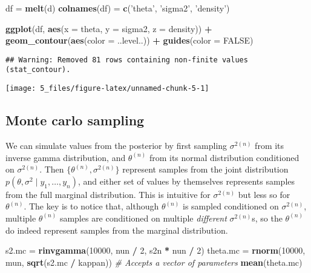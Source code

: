 \documentclass[]{article}
\newenvironment{Shaded}{\begin{snugshade}}{\end{snugshade}}
\newcommand{\CommentTok}[1]{\textcolor[rgb]{0.56,0.35,0.01}{\textit{#1}}}
\newcommand{\DataTypeTok}[1]{\textcolor[rgb]{0.13,0.29,0.53}{#1}}
\newcommand{\DecValTok}[1]{\textcolor[rgb]{0.00,0.00,0.81}{#1}}
\newcommand{\KeywordTok}[1]{\textcolor[rgb]{0.13,0.29,0.53}{\textbf{#1}}}
\newcommand{\NormalTok}[1]{#1}
\newcommand{\OperatorTok}[1]{\textcolor[rgb]{0.81,0.36,0.00}{\textbf{#1}}}
\newcommand{\OtherTok}[1]{\textcolor[rgb]{0.56,0.35,0.01}{#1}}
\newcommand{\StringTok}[1]{\textcolor[rgb]{0.31,0.60,0.02}{#1}}
\begin{document}
\begin{Shaded}
\begin{Highlighting}[]
\NormalTok{df =}\StringTok{ }\KeywordTok{melt}\NormalTok{(d)}
\KeywordTok{colnames}\NormalTok{(df) =}\StringTok{ }\KeywordTok{c}\NormalTok{(}\StringTok{'theta'}\NormalTok{, }\StringTok{'sigma2'}\NormalTok{, }\StringTok{'density'}\NormalTok{)}

\KeywordTok{ggplot}\NormalTok{(df, }\KeywordTok{aes}\NormalTok{(}\DataTypeTok{x =}\NormalTok{ theta, }\DataTypeTok{y =}\NormalTok{ sigma2, }\DataTypeTok{z =}\NormalTok{ density)) }\OperatorTok{+}
\StringTok{  }\KeywordTok{geom_contour}\NormalTok{(}\KeywordTok{aes}\NormalTok{(}\DataTypeTok{color =}\NormalTok{ ..level..)) }\OperatorTok{+}
\StringTok{  }\KeywordTok{guides}\NormalTok{(}\DataTypeTok{color =} \OtherTok{FALSE}\NormalTok{)}
\end{Highlighting}
\end{Shaded}

\begin{verbatim}
## Warning: Removed 81 rows containing non-finite values (stat_contour).
\end{verbatim}

\begin{center}\texttt{[image: 5\_files/figure-latex/unnamed-chunk-5-1]} \end{center}

\hypertarget{monte-carlo-sampling}{%
\subsection{Monte carlo sampling}\label{monte-carlo-sampling}}

We can simulate values from the posterior by first sampling
\(\sigma^{2(n)}\) from its inverse gamma distribution, and
\(\theta^{(n)}\) from its normal distribution conditioned on
\(\sigma^{2(n)}\). Then \(\{\theta^{(n)}, \sigma^{2(n)}\}\) represent
samples from the joint distribution
\(p(\theta, \sigma^2 \mid y_1, \dots, y_n)\), and either set of values
by themselves represents samples from the full marginal distribution.
This is intuitive for \(\sigma^{2(n)}\) but less so for
\(\theta^{(n)}\). The key is to notice that, although \(\theta^{(n)}\)
is sampled conditioned on \(\sigma^{2(n)}\), multiple \(\theta^{(n)}\)
samples are conditioned on multiple \emph{different} \(\sigma^{2(n)}\)s,
so the \(\theta^{(n)}\) do indeed represent samples from the marginal
distribution.

\begin{Shaded}
\begin{Highlighting}[]
\NormalTok{s2.mc =}\StringTok{ }\KeywordTok{rinvgamma}\NormalTok{(}\DecValTok{10000}\NormalTok{, nun }\OperatorTok{/}\StringTok{ }\DecValTok{2}\NormalTok{, s2n }\OperatorTok{*}\StringTok{ }\NormalTok{nun }\OperatorTok{/}\StringTok{ }\DecValTok{2}\NormalTok{)}
\NormalTok{theta.mc =}\StringTok{ }\KeywordTok{rnorm}\NormalTok{(}\DecValTok{10000}\NormalTok{, mun, }\KeywordTok{sqrt}\NormalTok{(s2.mc }\OperatorTok{/}\StringTok{ }\NormalTok{kappan)) }\CommentTok{# Accepts a vector of parameters}
\KeywordTok{mean}\NormalTok{(theta.mc)}
\end{Highlighting}
\end{Shaded}
\end{document}
